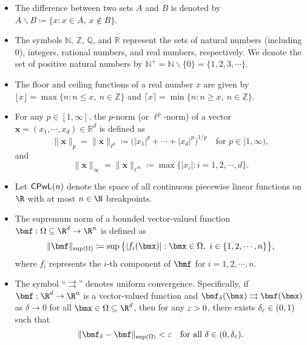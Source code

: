 \documentclass[11pt,a4paper]{article}
\let\dots\cdots
\begin{document}
\begin{itemize}
    \item The difference between two sets \( A \) and \( B \) is denoted by \( A \backslash B \coloneqq \{ x : x \in A, \ x \notin B \} \).
    
    \item The symbols \( \mathbb{N} \), \( \mathbb{Z} \), \( \mathbb{Q} \), and \( \mathbb{R} \) represent the sets of natural numbers (including 0), integers, rational numbers, and real numbers, respectively. We denote the set of positive natural numbers by \( \mathbb{N}^+ = \mathbb{N} \backslash \{0\} = \{1, 2, 3, \dots \} \).
    
    \item The floor and ceiling functions of a real number \( x \) are given by
    \( \lfloor x \rfloor = \max \{ n : n \le x, \ n \in \mathbb{Z} \} \) and \( \lceil x \rceil = \min \{ n : n \ge x, \ n \in \mathbb{Z} \} \).
    
    \item For any \( p \in [1, \infty] \), the \( p \)-norm (or \( \ell^p \)-norm) of a vector \( \bm{x} = (x_1, \dots, x_d) \in \mathbb{R}^d \) is defined as
    \begin{equation*}
        \|\bm{x}\|_p = \|\bm{x}\|_{\ell^p} \coloneqq \big( |x_1|^p + \dots + |x_d|^p \big)^{1/p}\quad \text{for } p \in [1, \infty),
    \end{equation*}
    and
    \begin{equation*}
        \|\bm{x}\|_{\infty} = \|\bm{x}\|_{\ell^\infty} \coloneqq \max\big\{ |x_i| : i = 1, 2, \dots, d \big\}.
    \end{equation*}


    \item Let $\cpl(n)$ denote the space of all continuous piecewise linear functions on $\R$ with at most $n \in \N$ breakpoints.
    
    \item The supremum norm of a bounded vector-valued function $\bmf: \Omega\subseteq \R^d \to \R^n$ is defined as
    \begin{equation*}
        \|\bmf\|_{\sup(\Omega)}\coloneqq \sup\big\{|f_i(\bmx)|: \bmx\in \Omega,\   i\in\{1,2,\dots,n\}\big\},
    \end{equation*}
    where $f_i$ represents the $i$-th component of $\bmf$ for $i = 1,2,\dots,n$.

    \item The symbol ``$\rightrightarrows$'' denotes uniform convergence. Specifically, if $\bmf:\R^d\to\R^n$ is a vector-valued function and $\bmf_\delta(\bmx) \rightrightarrows \bmf(\bmx)$ as $\delta\to 0$ for all $\bmx\in \Omega\subseteq \R^d$, then for any $\varepsilon>0$, there exists $\delta_\varepsilon\in (0,1)$ such that
    \begin{equation*}		
        \|\bmf_\delta-\bmf\|_{\sup(\Omega)}< \eps\quad \text{for all } \delta\in (0,\delta_\eps).
    \end{equation*}


\end{itemize}
\end{document}
